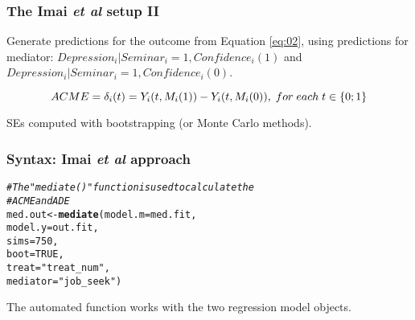 \documentclass[11pt,english,dvipsnames,aspectratio=169,handout]{beamer}\usepackage[]{graphicx}\usepackage[]{xcolor}
\makeatletter
\newcommand{\hlnum}[1]{\textcolor[rgb]{0.686,0.059,0.569}{#1}}%
\newcommand{\hlstr}[1]{\textcolor[rgb]{0.192,0.494,0.8}{#1}}%
\newcommand{\hlcom}[1]{\textcolor[rgb]{0.678,0.584,0.686}{\textit{#1}}}%
\newcommand{\hlstd}[1]{\textcolor[rgb]{0.345,0.345,0.345}{#1}}%
\newcommand{\hlkwb}[1]{\textcolor[rgb]{0.69,0.353,0.396}{#1}}%
\newcommand{\hlkwc}[1]{\textcolor[rgb]{0.333,0.667,0.333}{#1}}%
\newcommand{\hlkwd}[1]{\textcolor[rgb]{0.737,0.353,0.396}{\textbf{#1}}}%
\newenvironment{kframe}{%
 \def\at@end@of@kframe{}%
 \ifinner\ifhmode%
  \def\at@end@of@kframe{\end{minipage}}%
  \begin{minipage}{\columnwidth}%
 \fi\fi%
 \def\FrameCommand##1{\hskip\@totalleftmargin \hskip-\fboxsep
 \colorbox{shadecolor}{##1}\hskip-\fboxsep
     \hskip-\linewidth \hskip-\@totalleftmargin \hskip\columnwidth}%
 \MakeFramed {\advance\hsize-\width
   \@totalleftmargin\z@ \linewidth\hsize
   \@setminipage}}%
 {\par\unskip\endMakeFramed%
 \at@end@of@kframe}
\newenvironment{knitrout}{}{} %
\makeatother
\begin{document}
\begin{frame}
  \frametitle{The Imai \textit{et al} setup II}
  Generate predictions for the outcome from Equation \ref{eq:02}, using predictions for mediator: $Depression_i | Seminar_i=1, Confidence_i(1)$ and $Depression_i | Seminar_i=1, Confidence_i(0)$.
  
  \begin{equation}
    \footnotesize
		ACME = \delta_i(t) = Y_i(t, M_i(1)) - Y_i(t, M_i(0)),\; for\; each\; t\in \{0;1\}
	\end{equation}
  
  SEs computed with bootstrapping (or Monte Carlo methods).
  
\end{frame}


\begin{frame}[fragile]
  \frametitle{Syntax: Imai \textit{et al} approach}



\begin{knitrout}\footnotesize
{}\color{fgcolor}\begin{kframe}
\begin{alltt}
\hlcom{# The "mediate()" function is used to calculate the }
\hlcom{# ACME and ADE}
\hlstd{med.out} \hlkwb{<-} \hlkwd{mediate}\hlstd{(}\hlkwc{model.m} \hlstd{= med.fit,}
                   \hlkwc{model.y} \hlstd{= out.fit,}
                   \hlkwc{sims} \hlstd{=} \hlnum{750}\hlstd{,}
                   \hlkwc{boot} \hlstd{=} \hlnum{TRUE}\hlstd{,}
                   \hlkwc{treat} \hlstd{=} \hlstr{"treat_num"}\hlstd{,}
                   \hlkwc{mediator} \hlstd{=} \hlstr{"job_seek"}\hlstd{)}
\end{alltt}
\end{kframe}
\end{knitrout}

The automated function works with the two regression model objects.

\end{frame}
\end{document}
